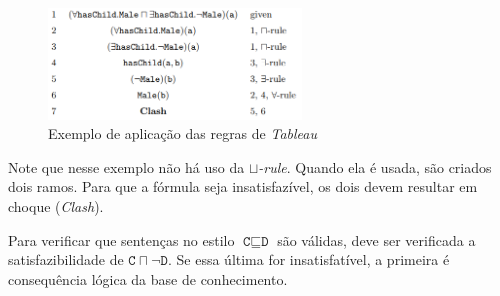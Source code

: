 	\begin{figure}[H]
		\centering
		\includegraphics[width=0.6\textwidth]{Capitulos/Logicas/tableau}
		\caption{Exemplo de aplicação das regras de \textit{Tableau}}
	\end{figure}

Note que nesse exemplo não há uso da \textit{$ \sqcup $-rule}. Quando ela é usada, são criados dois ramos. Para que a fórmula seja insatisfazível, os dois devem resultar em choque (\textit{Clash}).

Para verificar que sentenças no estilo $ \texttt{C} \sqsubseteq \texttt{D} $ são válidas, deve ser verificada a satisfazibilidade de $ \texttt{C} \sqcap \neg \texttt{D} $. Se essa última for insatisfatível, a primeira é consequência lógica da base de conhecimento.